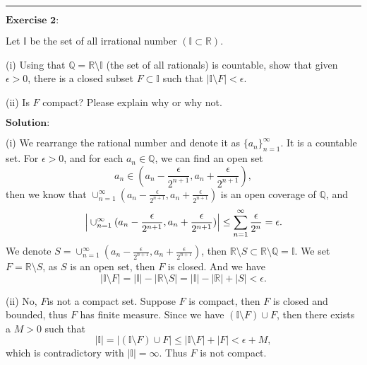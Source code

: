 \documentclass[12pt,a4paper]{ctexart}
\begin{document}
\noindent\rule[0.25\baselineskip]{\textwidth}{0.5pt}

\vspace{8pt}
$\textbf{Exercise 2:}$

Let $\mathbb{I}$ be the set of all irrational number $(\mathbb{I} \subset \mathbb{R})$.

(i) Using that $\mathbb{Q} = \mathbb{R} \setminus \mathbb{I}$ (the set of all rationals) is countable, show that given $\epsilon > 0$, there is a closed subset $F \subset \mathbb{I}$ such that $|\mathbb{I} \setminus F| < \epsilon$.

(ii) Is $F$ compact? Please explain why or why not.
 
\vspace{8pt}
$\textbf{Solution:}$

(i) We rearrange the rational number and denote it as $\{a_{n}\}_{n=1}^{\infty}$. It is a countable set. For $\epsilon > 0$, and for each $a_{n} \in \mathbb{Q}$, we can find an open set
\begin{equation*}
    a_{n} \in (a_{n} - \frac{\epsilon}{2^{n+1}}, a_{n} + \frac{\epsilon}{2^{n+1}}),
\end{equation*}
then we know that $\cup_{n=1}^{\infty} (a_{n} - \frac{\epsilon}{2^{n+1}}, a_{n} + \frac{\epsilon}{2^{n+1}}) $ is an open coverage of $\mathbb{Q}$, and
\begin{equation*}
    \Big{|} \cup_{n=1}^{\infty} (a_{n} - \frac{\epsilon}{2^{n+1}}, a_{n} + \frac{\epsilon}{2^{n+1}}) \Big{|} \leq \sum_{n=1}^{\infty} \frac{\epsilon}{2^{n}} = \epsilon.
\end{equation*}
We denote $S = \cup_{n=1}^{\infty} (a_{n} - \frac{\epsilon}{2^{n+1}}, a_{n} + \frac{\epsilon}{2^{n+1}})$, then $\mathbb{R} \setminus S \subset \mathbb{R} \setminus \mathbb{Q} = \mathbb{I}$. We set $F = \mathbb{R} \setminus S$, as $S$ is an open set, then $F$ is closed. And we have
\begin{equation*}
    |\mathbb{I} \setminus F| = |\mathbb{I}| - |\mathbb{R} \setminus S| = |\mathbb{I}| - |\mathbb{R} | + |S| < \epsilon.
\end{equation*}

(ii) No, $F$is not a compact set. Suppose $F$ is compact, then $F$ is closed and bounded, thus $F$ has finite measure. Since we have $(\mathbb{I} \setminus F) \cup F$, then there exists a $M > 0$ such that 
\begin{equation*}
    |\mathbb{I}| = |(\mathbb{I} \setminus F) \cup F| \leq |\mathbb{I} \setminus F| + |F| < \epsilon + M,
\end{equation*}
which is contradictory with $|\mathbb{I}| = \infty$. Thus $F$ is not compact.
\end{document}
